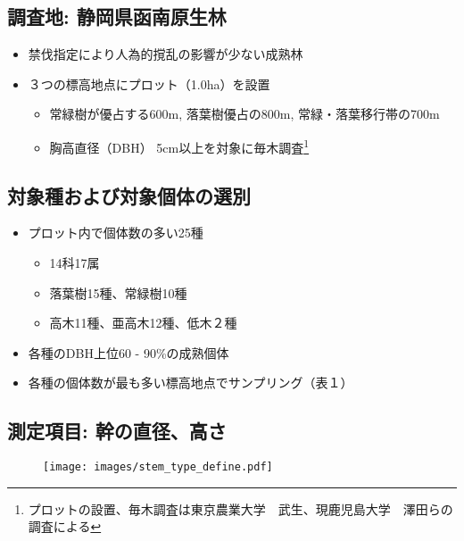 \documentclass[a0, 30pt, plainboxedsections]{sciposter} %
\begin{document}
\begin{multicols}{3}\footnotesize{

\subsection*{\small{調査地: 静岡県函南原生林}}

\begin{itemize}\setlength{\itemindent}{1em}
  \item 禁伐指定により人為的撹乱の影響が少ない成熟林
  \item ３つの標高地点にプロット（1.0ha）を設置
  \begin{itemize}\setlength{\itemindent}{1em}
    \item 常緑樹が優占する600m, 落葉樹優占の800m, \newline 常緑・落葉移行帯の700m
    \item 胸高直径（DBH） 5cm以上を対象に毎木調査\footnote{プロットの設置、毎木調査は東京農業大学　武生、現鹿児島大学　澤田らの調査による}
  \end{itemize}
\end{itemize}

\subsection*{\small{対象種および対象個体の選別}}

\begin{itemize}\setlength{\itemindent}{1em}
  \item プロット内で個体数の多い25種
  \begin{itemize}\setlength{\itemindent}{1em}
    \item 14科17属
    \item 落葉樹15種、常緑樹10種
    \item 高木11種、亜高木12種、低木２種
  \end{itemize}
  \item 各種のDBH上位60 - 90\%の成熟個体
  \item 各種の個体数が最も多い標高地点でサンプリング（表１）
\end{itemize}

\columnbreak
\subsection*{\small{測定項目: 幹の直径、高さ}}

\begin{figure}
	\centering
	\texttt{[image: images/stem\_type\_define.pdf]}
\end{figure}

}
\end{multicols}
\end{document}
